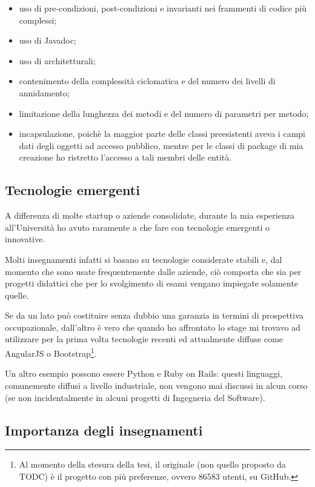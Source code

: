 \begin{itemize}
\item uso di pre-condizioni, post-condizioni e invarianti nei frammenti di
  codice più complessi;
\item uso di Javadoc;
\item uso di  architetturali;
\item contenimento della complessità ciclomatica e del numero dei livelli di
  annidamento;
\item limitazione della lunghezza dei metodi e del numero di parametri per
  metodo;
\item incapsulazione, poichè la maggior parte delle classi preesistenti aveva
  i campi dati degli oggetti ad accesso pubblico, mentre per le classi di
  package di mia creazione ho ristretto l'accesso a tali membri delle entità.
\end{itemize}

\subsection{Tecnologie emergenti}

A differenza di molte startup o aziende consolidate, durante la mia esperienza
all'Università ho avuto raramente a che fare con tecnologie emergenti o
innovative.

Molti insegnamenti infatti si basano su tecnologie considerate stabili e,
dal momento che sono usate frequentemente dalle aziende, ciò comporta che sia
per progetti didattici che per lo svolgimento di esami vengano impiegate
solamente quelle.

Se da un lato può costituire senza dubbio una garanzia in termini di
prospettiva occupazionale, dall'altro è vero che quando ho affrontato lo stage
mi trovavo ad utilizzare per la prima volta tecnologie recenti ed attualmente
diffuse come AngularJS o Bootstrap\footnote{Al momento della stesura della
tesi, il  originale (non quello proposto da TODC) è il
progetto con più preferenze, ovvero 86583 utenti, su GitHub.}.

Un altro esempio possono essere Python e Ruby on Rails: questi linguaggi,
comunemente diffusi a livello industriale, non vengono mai discussi in alcun
corso (se non incidentalmente in alcuni progetti di Ingegneria del Software).

\subsection{Importanza degli insegnamenti}

